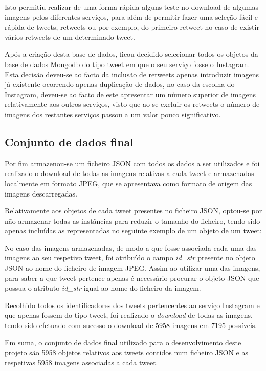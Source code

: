 Isto permitiu realizar de uma forma rápida alguns teste no download de algumas imagens pelos diferentes serviços, para além de permitir fazer uma seleção fácil e rápida de tweets, retweets ou por exemplo, do primeiro retweet no caso de existir vários retweets de um determinado tweet. 

Após a criação desta base de dados, ficou decidido selecionar todos os objetos da base de dados Mongodb do tipo tweet em que o seu serviço fosse o Instagram. Esta decisão deveu-se ao facto da inclusão de retweets apenas introduzir imagens já existente ocorrendo apenas duplicação de dados, no caso da escolha do Instagram, deveu-se ao facto de este apresentar um número superior de imagens relativamente aos outros serviços, visto que ao se excluir os retweets o número de imagens dos restantes serviços passou a um valor pouco significativo.

\subsection{Conjunto de dados final}

Por fim armazenou-se um ficheiro JSON com todos os dados a ser utilizados e foi realizado o download de todas as imagens relativas a cada tweet e armazenadas localmente em formato JPEG, que se apresentava como formato de origem das imagens descarregadas. 

Relativamente aos objetos de cada tweet presentes no ficheiro JSON, optou-se por não armazenar todas as instâncias para reduzir o tamanho do ficheiro, tendo sido apenas incluídas as representadas no seguinte exemplo de um objeto de um tweet:



No caso das imagens armazenadas, de modo a que fosse associada cada uma das imagens ao seu respetivo tweet, foi atribuído o campo \textit{id\_str} presente no objeto JSON ao nome do ficheiro de imagem JPEG. Assim ao utilizar uma das imagens, para saber a que tweet pertence apenas é necessário procurar o objeto JSON que possua o atributo \textit{id\_str} igual ao nome do ficheiro da imagem.

Recolhido todos os identificadores dos tweets pertencentes ao serviço Instagram e que apenas fossem do tipo tweet, foi realizado o \textit{download} de todas as imagens, tendo sido efetuado com sucesso o download de 5958 imagens em 7195 possíveis.

Em suma, o conjunto de dados final utilizado para o desenvolvimento deste projeto são 5958 objetos relativos aos tweets contidos num ficheiro JSON e as respetivas 5958 imagens associadas a cada tweet.

